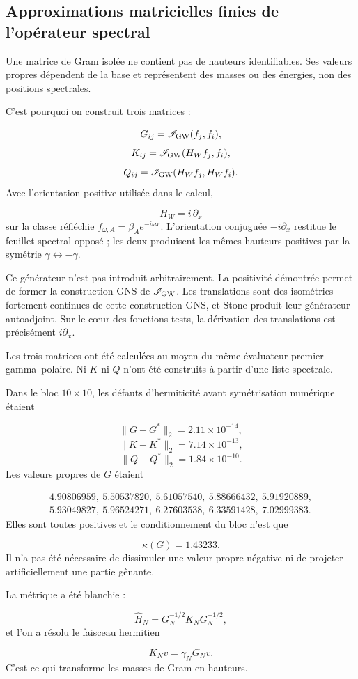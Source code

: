 \subsection{Approximations matricielles finies de l'opérateur spectral}
Une matrice de Gram isolée ne contient pas de hauteurs identifiables. Ses valeurs propres dépendent de la base et représentent des masses ou des énergies, non des positions spectrales.\par
C'est pourquoi on construit trois matrices :\par
\[
G_{ij}=\mathscr I_{\rm GW}(f_j,f_i),
\]
\[
K_{ij}=\mathscr I_{\rm GW}(H_Wf_j,f_i),
\]
\[
Q_{ij}=\mathscr I_{\rm GW}(H_Wf_j,H_Wf_i).
\]
Avec l'orientation positive utilisée dans le calcul,\par
\[
H_W=i\,\partial_x
\]
sur la classe réfléchie \(f_{\omega,A}=\beta_Ae^{-i\omega x}\). L'orientation conjuguée \(-i\partial_x\) restitue le feuillet spectral opposé ; les deux produisent les mêmes hauteurs positives par la symétrie \(\gamma\leftrightarrow-\gamma\).\par
Ce générateur n'est pas introduit arbitrairement. La positivité démontrée permet de former la construction GNS de \(\mathscr I_{\rm GW}\). Les translations sont des isométries fortement continues de cette construction GNS, et Stone produit leur générateur autoadjoint. Sur le cœur des fonctions tests, la dérivation des translations est précisément \(i\partial_x\).\par
Les trois matrices ont été calculées au moyen du même évaluateur premier–gamma–polaire. Ni \(K\) ni \(Q\) n'ont été construits à partir d'une liste spectrale.\par
Dans le bloc \(10\times10\), les défauts d'hermiticité avant symétrisation numérique étaient\par
\[
\|G-G^*\|_2=2.11\times10^{-14},
\]
\[
\|K-K^*\|_2=7.14\times10^{-13},
\]
\[
\|Q-Q^*\|_2=1.84\times10^{-10}.
\]
Les valeurs propres de \(G\) étaient\par
\[
\begin{aligned}
4.90806959,\ 5.50537820,\ 5.61057540,\ 5.88666432,\ 5.91920889,\\
5.93049827,\ 5.96524271,\ 6.27603538,\ 6.33591428,\ 7.02999383.
\end{aligned}
\]
Elles sont toutes positives et le conditionnement du bloc n'est que\par
\[
\kappa(G)=1.43233.
\]
Il n'a pas été nécessaire de dissimuler une valeur propre négative ni de projeter artificiellement une partie gênante.\par
La métrique a été blanchie :\par
\[
\widehat H_N
=
G_N^{-1/2}K_NG_N^{-1/2},
\]
et l'on a résolu le faisceau hermitien\par
\[
K_Nv=\gamma_NG_Nv.
\]
C'est ce qui transforme les masses de Gram en hauteurs.\par
{}

